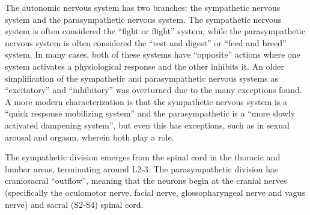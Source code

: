The autonomic nervous system has two branches: the sympathetic nervous system and the parasympathetic nervous system. The sympathetic nervous system is often considered the ``fight or flight'' system, while the parasympathetic nervous system is often considered the ``rest and digest'' or ``feed and breed'' system. In many cases, both of these systems have ``opposite'' actions where one system activates a physiological response and the other inhibits it. An older simplification of the sympathetic and parasympathetic nervous systems as ``excitatory'' and ``inhibitory'' was overturned due to the many exceptions found. A more modern characterization is that the sympathetic nervous system is a ``quick response mobilizing system'' and the parasympathetic is a ``more slowly activated dampening system'', but even this has exceptions, such as in sexual arousal and orgasm, wherein both play a role.

The sympathetic division emerges from the spinal cord in the thoracic and lumbar areas, terminating around L2-3. The parasympathetic division has craniosacral ``outflow'', meaning that the neurons begin at the cranial nerves (specifically the oculomotor nerve, facial nerve, glossopharyngeal nerve and vagus nerve) and sacral (S2-S4) spinal cord.



